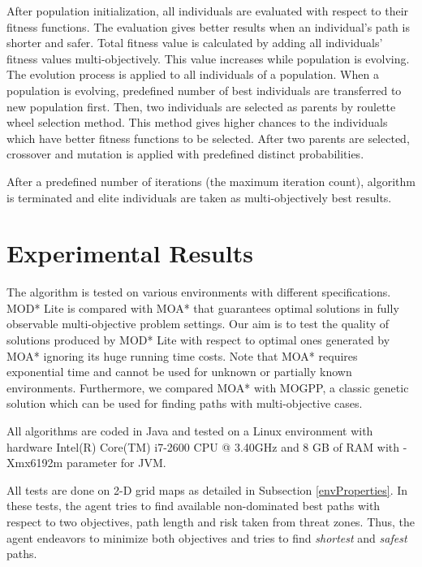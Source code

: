 \documentclass[10pt,journal]{IEEEtran}
\begin{document}
After population initialization, all individuals are evaluated with respect to their fitness functions. The evaluation gives better results when an individual's path is shorter and safer. Total fitness value is calculated by adding all individuals' fitness values multi-objectively. This value increases while population is evolving. The evolution process is applied to all individuals of a population. When a population is evolving, predefined number of best individuals are transferred to new population first. Then, two individuals are selected as parents by roulette wheel selection method. This method gives higher chances to the individuals which have better fitness functions to be selected. After two parents are selected, crossover and mutation is applied with predefined distinct probabilities.

After a predefined number of iterations (the maximum iteration count), algorithm is terminated and elite individuals are taken as multi-objectively best results.

\section{Experimental Results}
\label{chapter:experiments}

The algorithm is tested on various environments with different specifications. MOD* Lite is compared with MOA* that guarantees optimal solutions in fully observable multi-objective problem settings. Our aim is to test the quality of solutions produced by MOD* Lite with respect to optimal ones generated by MOA* ignoring its huge running time costs. Note that MOA* requires exponential time and cannot be used for unknown or partially known environments.  Furthermore, we  compared MOA* with MOGPP, a classic genetic solution which can be used for finding paths with multi-objective cases.

All algorithms are coded in Java and tested on a Linux environment with hardware Intel(R) Core(TM) i7-2600 CPU @ 3.40GHz and 8 GB of RAM with -Xmx6192m parameter for JVM.

All tests are done on 2-D grid maps as detailed in Subsection \ref{envProperties}. In these tests, the agent tries to find available non-dominated best paths with respect to two objectives, path length and risk taken from threat zones. Thus, the agent endeavors to minimize both objectives and tries to find \textit{shortest} and \textit{safest} paths.
\end{document}
